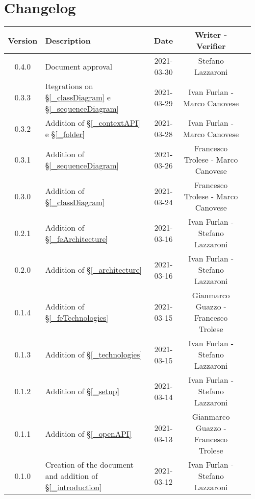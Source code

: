 \section*{Changelog}

\begin{center}
	\begin{longtable}{|c|p{5cm}|c|c|c|}
	\hline
	\rowcolor{lighter-grayer}
	\textbf{Version} & \textbf{Description} & \textbf{Date} & \textbf{Writer - Verifier} \\
	\hline
	\endfirsthead

	\hline
	0.4.0 & Document approval & 2021-03-30 & Stefano Lazzaroni\\
	0.3.3 & Itegrations on \S\ref{_classDiagram} e \S\ref{_sequenceDiagram} & 2021-03-29 & Ivan Furlan - Marco Canovese \\
	\hline
	0.3.2 & Addition of \S\ref{_contextAPI} e \S\ref{_folder} & 2021-03-28 & Ivan Furlan - Marco Canovese \\
	\hline
	0.3.1 & Addition of \S\ref{_sequenceDiagram} & 2021-03-26 & Francesco Trolese - Marco Canovese \\
	\hline
	0.3.0 & Addition of \S\ref{_classDiagram} & 2021-03-24 & Francesco Trolese - Marco Canovese \\
	\hline
	0.2.1 & Addition of \S\ref{_feArchitecture} & 2021-03-16 & Ivan Furlan - Stefano Lazzaroni \\
	\hline
	0.2.0 & Addition of \S\ref{_architecture} & 2021-03-16 & Ivan Furlan - Stefano Lazzaroni \\
	\hline
	0.1.4 & Addition of \S\ref{_feTechnologies} & 2021-03-15 & Gianmarco Guazzo - Francesco Trolese \\
	\hline
	0.1.3 & Addition of \S\ref{_technologies} & 2021-03-15 & Ivan Furlan - Stefano Lazzaroni \\
	\hline
	0.1.2 & Addition of \S\ref{_setup} & 2021-03-14 & Ivan Furlan - Stefano Lazzaroni \\
	\hline
	0.1.1 & Addition of \S\ref{_openAPI} & 2021-03-13 & Gianmarco Guazzo - Francesco Trolese \\
	\hline
	0.1.0 & Creation of the document and addition of \S\ref{_introduction} & 2021-03-12 & Ivan Furlan - Stefano Lazzaroni\\
	\hline

	\end{longtable}
\end{center}